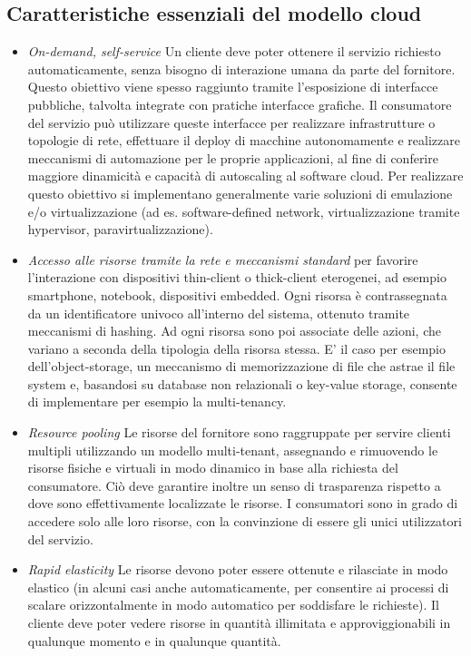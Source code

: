 \subsection{Caratteristiche essenziali del modello cloud}
\begin{itemize}
\item \textit{On-demand, self-service} Un cliente deve poter ottenere il servizio richiesto automaticamente, senza bisogno di interazione umana da parte del fornitore.
Questo obiettivo viene spesso raggiunto tramite l'esposizione di interfacce pubbliche, talvolta integrate con pratiche interfacce grafiche. Il consumatore del servizio può utilizzare queste interfacce per realizzare infrastrutture o topologie di rete, effettuare il deploy di macchine autonomamente e realizzare meccanismi di automazione per le proprie applicazioni, al fine di conferire maggiore dinamicità e capacità di autoscaling al software cloud.
Per realizzare questo obiettivo si implementano generalmente varie soluzioni di emulazione e/o virtualizzazione (ad es. software-defined network, virtualizzazione tramite hypervisor, paravirtualizzazione).
\item \textit{Accesso alle risorse tramite la rete e meccanismi standard} per favorire l'interazione con dispositivi thin-client o thick-client eterogenei, ad esempio smartphone, notebook, dispositivi embedded. Ogni risorsa è contrassegnata da un identificatore univoco all'interno del sistema, ottenuto tramite meccanismi di hashing. Ad ogni risorsa sono poi associate delle azioni, che variano a seconda della tipologia della risorsa stessa.
E' il caso per esempio dell'object-storage, un meccanismo di memorizzazione di file che astrae il file system e, basandosi su database non relazionali o key-value storage, consente di implementare per esempio la multi-tenancy.
\item \textit{Resource pooling} Le risorse del fornitore sono raggruppate per servire clienti multipli utilizzando un modello multi-tenant, assegnando e rimuovendo le risorse fisiche e virtuali in modo dinamico in base alla richiesta del consumatore.
Ciò deve garantire inoltre un senso di trasparenza rispetto a dove sono effettivamente localizzate le risorse.
I consumatori sono in grado di accedere solo alle loro risorse, con la convinzione di essere gli unici utilizzatori del servizio. 
\item \textit{Rapid elasticity} Le risorse devono poter essere ottenute e rilasciate in modo elastico (in alcuni casi anche automaticamente, per consentire ai processi di scalare orizzontalmente in modo automatico per soddisfare le richieste). Il cliente deve poter vedere risorse in quantità illimitata e approviggionabili in qualunque momento e in qualunque quantità.

\end{itemize}
